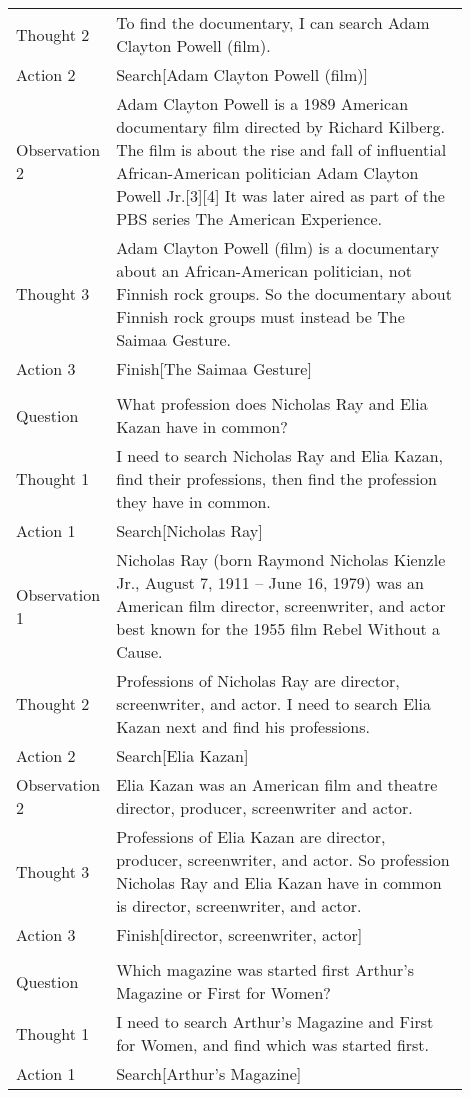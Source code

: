 \begin{table}[H]
\begin{minipage}{0.9\linewidth}
\begin{tabular}{l p{0.9\linewidth}}
Thought 2 &  To find the documentary, I can search Adam Clayton Powell (film).\\
Action 2 &  Search[Adam Clayton Powell (film)]\\
Observation 2 &  Adam Clayton Powell is a 1989 American documentary film directed by Richard Kilberg.
The film is about the rise and fall of influential African-American politician Adam Clayton Powell Jr.[3][4] It was later aired as part of the PBS series The American Experience.\\
Thought 3 &  Adam Clayton Powell (film) is a documentary about an African-American politician, not Finnish rock groups. So the documentary about Finnish rock groups must instead be The Saimaa Gesture.\\
Action 3 &  Finish[The Saimaa Gesture]\\
\\
Question &  What profession does Nicholas Ray and Elia Kazan have in common?\\
Thought 1 &  I need to search Nicholas Ray and Elia Kazan, find their professions, then find the profession they have in common.\\
Action 1 &  Search[Nicholas Ray]\\
Observation 1 &  Nicholas Ray (born Raymond Nicholas Kienzle Jr., August 7, 1911 – June 16, 1979) was an American film director, screenwriter, and actor best known for the 1955 film Rebel Without a Cause.\\
Thought 2 &  Professions of Nicholas Ray are director, screenwriter, and actor. I need to search Elia Kazan next and find his professions.\\
Action 2 &  Search[Elia Kazan]\\
Observation 2 &  Elia Kazan was an American film and theatre director, producer, screenwriter and actor.\\
Thought 3 &  Professions of Elia Kazan are director, producer, screenwriter, and actor. So profession Nicholas Ray and Elia Kazan have in common is director, screenwriter, and actor.\\
Action 3 &  Finish[director, screenwriter, actor]\\
\\
Question &  Which magazine was started first Arthur's Magazine or First for Women?\\
Thought 1 &  I need to search Arthur's Magazine and First for Women, and find which was started first.\\
Action 1 &  Search[Arthur's Magazine]\\

\end{tabular}
\end{minipage}
\end{table}
